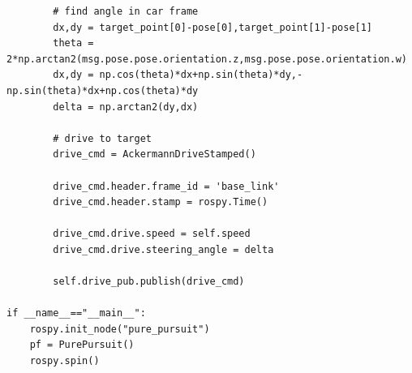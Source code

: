 \documentclass{article}
\begin{document}
{\begin{verbatim}
        # find angle in car frame
        dx,dy = target_point[0]-pose[0],target_point[1]-pose[1]
        theta = 2*np.arctan2(msg.pose.pose.orientation.z,msg.pose.pose.orientation.w)
        dx,dy = np.cos(theta)*dx+np.sin(theta)*dy,-np.sin(theta)*dx+np.cos(theta)*dy
        delta = np.arctan2(dy,dx)
        
        # drive to target
        drive_cmd = AckermannDriveStamped()
        
        drive_cmd.header.frame_id = 'base_link'
        drive_cmd.header.stamp = rospy.Time()
        
        drive_cmd.drive.speed = self.speed
        drive_cmd.drive.steering_angle = delta
        
        self.drive_pub.publish(drive_cmd)

if __name__=="__main__":
    rospy.init_node("pure_pursuit")
    pf = PurePursuit()
    rospy.spin()

\end{verbatim}
}
\end{document}
